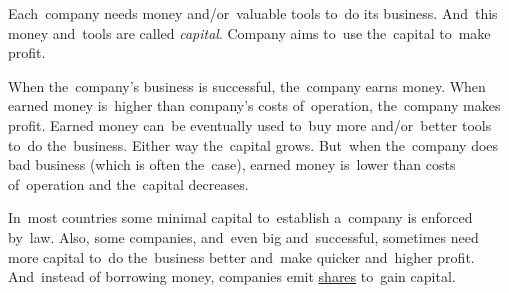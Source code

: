 \label{capital}
Each~company needs money and/or~valuable tools to~do its business.
And~this money and~tools are called \textit{capital}.
Company aims to~use the~capital to~make profit.

When the~company's business is successful, the~company earns money.
When earned money is~higher than company's costs of~operation, the~company makes profit.
Earned money can~be eventually used to~buy more and/or~better tools to~do the~business.
Either way the~capital grows.
But~when the~company does bad business (which is often the~case), earned money is~lower than costs of~operation and the~capital decreases.

In~most countries some minimal capital to~establish a~company is enforced by~law.
Also, some companies, and~even big and~successful, sometimes need more capital to~do the~business better and~make quicker and~higher profit.
And~instead of borrowing money, companies emit \hyperref[shares]{shares} to~gain capital.
\newpage
